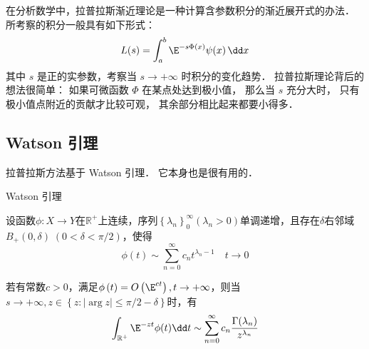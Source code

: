 

在分析数学中，拉普拉斯渐近理论是一种计算含参数积分的渐近展开式的办法． 所考察的积分一般具有如下形式：
\begin{equation}\label{LapAsm_eq1}
L(s)=\int_a^b\E^{-s\Phi(x)}\psi(x)\,\dd x
\end{equation}
其中 $s$ 是正的实参数，考察当 $s\to+\infty$ 时积分的变化趋势． 拉普拉斯理论背后的想法很简单： 如果可微函数 $\Phi$ 在某点处达到极小值， 那么当 $s$ 充分大时， 只有极小值点附近的贡献才比较可观， 其余部分相比起来都要小得多．

\subsection{Watson 引理}
拉普拉斯方法基于 Watson 引理． 它本身也是很有用的．

\begin{lemma}{Watson 引理}

设函数$\phi:X\to Y$在$\mathbb{R}^+$上连续，序列$\left\{\lambda_n\right\}_0^\infty\left(\lambda_n>0\right)$单调递增，且存在$\delta$右邻域$B_{+}(0,\delta)\;(0<\delta<\pi/2)$，使得
\begin{equation}\label{LapAsm_eq2}
  \phi\left(t\right)\sim\sum_{n=0}^{\infty}{c_nt^{\lambda_n-1}}\quad t\to0
\end{equation}

若有常数$c>0$，满足$\phi\left(t\right)=O\left(\E^{ct}\right),t\to+\infty$，则当$s\to+\infty,z\in{\left\{z:\left|\arg{z}\right|\le\pi/2-\delta\right\}}$时，有
\begin{equation}\label{LapAsm_eq3}
\int_{\mathbb{R}^+}\E^{-zt}\phi(t)\dd t\sim\sum_{n=0}^{\infty}{c_n}\frac{\Gamma(\lambda_n)}{z^{\lambda_n}}  
\end{equation}
\end{lemma}

